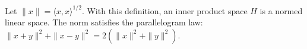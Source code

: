 Let $\|x\| = \langle x, x \rangle^{1/2}$. With this definition, an inner product space $H$ is a normed linear space. The norm satisfies the parallelogram law: $\|x + y\|^2 + \|x - y\|^2 = 2(\|x\|^2 + \|y\|^2)$.
